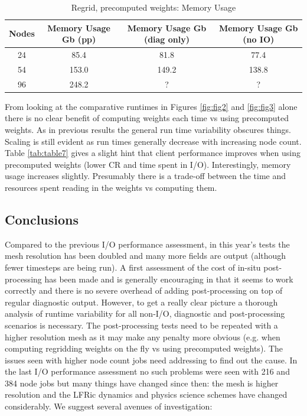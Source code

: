\begin{table}[ht!]
\scriptsize
  \begin{center}
    \caption{Regrid, precomputed weights: Memory Usage}
    \label{tab:table8}
     \begin{tabular}{|c|c|c|c|}
      \textbf{Nodes} & \textbf{Memory Usage Gb (pp) } & \textbf{Memory Usage Gb (diag only)} & \textbf{Memory Usage Gb (no IO)} \\
      \hline
      24 & 85.4 & 81.8 & 77.4 \\
      54 & 153.0 & 149.2 & 138.8 \\
      96 & 248.2 & ? & ? \\
    \end{tabular}
  \end{center}
\end{table}

\normalsize

From looking at the comparative runtimes in Figures \ref{fig:fig2} and \ref{fig:fig3} alone there is no clear benefit of computing weights each time vs using precomputed weights. As in previous results the general run time variability obscures things. Scaling is still evident as run times generally decrease with
increasing node count. Table \ref{tab:table7} gives a slight hint that client performance improves when using precomputed weights (lower CR and time spent in I/O).
Interestingly, memory usage increases slightly. Presumably there is a trade-off between the time and resources spent reading in the weights vs computing them.

\subsection{Conclusions}

Compared to the previous I/O performance assessment, in this year's tests the mesh resolution has been doubled and many more fields are output (although fewer timesteps are being run). A first assessment of the cost of in-situ post-processing has been made and is generally encouraging in that it seems to work correctly and there is no severe overhead of adding post-processing on top of regular diagnostic output. However, to get a really clear picture a thorough analysis of runtime variability for all non-I/O, diagnostic and post-processing scenarios is necessary. The post-processing tests need to be repeated with a higher resolution mesh as it may make any penalty more obvious (e.g. when computing regridding weights on the fly vs using precomputed weights). The issues seen with higher node count jobs need addressing to find out the cause. In the last I/O performance assessment no such problems were seen with 216 and 384 node jobs but many things have changed since then: the mesh is higher resolution and the LFRic dynamics and physics science schemes have changed considerably. 
We suggest several avenues of investigation:

